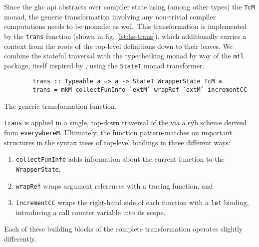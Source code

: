 \documentclass[thesis=B,english]{FITthesis}[2019/12/23]
\newcommand{\hackage}[1]{\texttt{#1}}
\newcommand{\hsType}[1]{\texttt{#1}}
\newcommand{\hsIdent}[1]{\texttt{#1}}
\newcommand{\hsCode}[1]{\texttt{#1}}
\begin{document}
Since the \acrshort{ghc} \acrshort{api} abstracts over compiler state using
(among other types) the \hsType{TcM} monad, the generic transformation
involving any non-trivial compiler computations needs to be monadic as well.
This transformation is implemented by the \hsIdent{trans} function (shown in
fig. \ref{lst:hs-trans}), which additionally carries a context from the roots
of the top-level definitions down to their leaves. We combine the stateful
traversal with the typechecking monad by way of the \hackage{mtl} package,
itself inspired by \cite{higher-order-polymorphism}, using the \hsType{StateT}
monad transformer.

\begin{listing}[h]
	\centering
	\begin{verbatim}
        trans :: Typeable a => a -> StateT WrapperState TcM a
        trans = mkM collectFunInfo `extM` wrapRef `extM` incrementCC
	\end{verbatim}
	\caption{The generic transformation function.}
	\label{lst:hs-trans}
\end{listing}

\hsIdent{trans} is applied in a single, top-down traversal of the
 via a \acrshort{syb} scheme derived from \hsIdent{everywhereM}.
Ultimately, the function pattern-matches on important structures in the syntax
trees of top-level bindings in three different ways:
\begin{enumerate}
	\item \hsIdent{collectFunInfo} adds information about the current function
		to the \hsType{WrapperState},
	\item \hsIdent{wrapRef} wraps argument references with a tracing function, and
	\item \hsIdent{incrementCC} wraps the right-hand side of each function with
		a \hsCode{let} binding, introducing a call counter variable into
		its scope.
\end{enumerate}

Each of these building blocks of the complete transformation operates slightly
differently.
\end{document}
